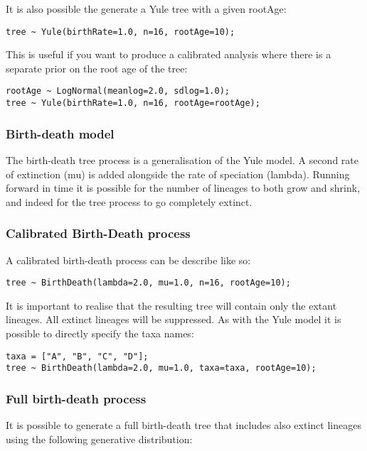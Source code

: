 \documentclass[oneside]{article}
\begin{document}
It is also possible the generate a Yule tree with a given rootAge:

\begin{verbatim}
tree ~ Yule(birthRate=1.0, n=16, rootAge=10);
\end{verbatim}

This is useful if you want to produce a calibrated analysis where there is a separate prior on the root age of the tree:

\begin{verbatim}
rootAge ~ LogNormal(meanlog=2.0, sdlog=1.0);
tree ~ Yule(birthRate=1.0, n=16, rootAge=rootAge);
\end{verbatim}

\subsubsection{Birth-death model}

The birth-death tree process is a generalisation of the Yule model. A second rate of extinction (mu) is added alongside
the rate of speciation (lambda). Running forward in time it is possible for the number of lineages to both grow and 
shrink, and indeed for the tree process to go completely extinct. 

\subsubsection{Calibrated Birth-Death process}

A calibrated birth-death process can be describe like so:

\begin{verbatim}
tree ~ BirthDeath(lambda=2.0, mu=1.0, n=16, rootAge=10);
\end{verbatim}

It is important to realise that the resulting tree will contain only the extant lineages. All extinct lineages will be
suppressed. As with the Yule model it is possible to directly specify the taxa names:

\begin{verbatim}
taxa = ["A", "B", "C", "D"];
tree ~ BirthDeath(lambda=2.0, mu=1.0, taxa=taxa, rootAge=10);
\end{verbatim}

\subsubsection{Full birth-death process}

It is possible to generate a full birth-death tree that includes also extinct lineages using the following generative
distribution:
\end{document}
